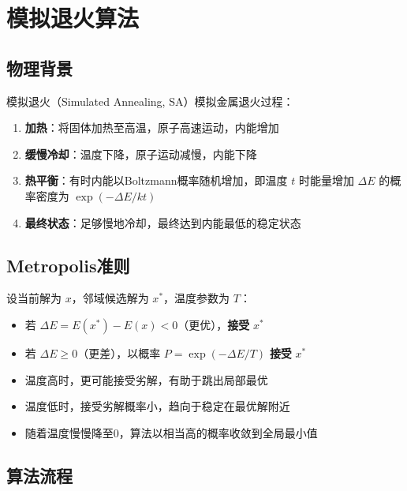 \section{模拟退火算法}\label{sec:sa}

\subsection{物理背景}

模拟退火（Simulated Annealing, SA）模拟金属退火过程：
\begin{enumerate}[label=\arabic*., leftmargin=2em]
    \item \textbf{加热}：将固体加热至高温，原子高速运动，内能增加
    \item \textbf{缓慢冷却}：温度下降，原子运动减慢，内能下降
    \item \textbf{热平衡}：有时内能以Boltzmann概率随机增加，即温度 $t$ 时能量增加 $\Delta E$ 的概率密度为 $\exp(-\Delta E / kt)$
    \item \textbf{最终状态}：足够慢地冷却，最终达到内能最低的稳定状态
\end{enumerate}

\subsection{Metropolis准则}

\begin{definition}[Metropolis接受准则]
设当前解为 $x$，邻域候选解为 $x^*$，温度参数为 $T$：
\begin{itemize}
    \item 若 $\Delta E = E(x^*) - E(x) < 0$（更优），\textbf{接受} $x^*$
    \item 若 $\Delta E \geq 0$（更差），以概率 $P = \exp(-\Delta E / T)$ \textbf{接受} $x^*$
\end{itemize}
\end{definition}

\begin{notebox}[模拟退火的关键机制]
\begin{itemize}[itemsep=0.3em]
    \item 温度高时，更可能接受劣解，有助于跳出局部最优
    \item 温度低时，接受劣解概率小，趋向于稳定在最优解附近
    \item 随着温度慢慢降至0，算法以相当高的概率收敛到全局最小值
\end{itemize}
\end{notebox}

\subsection{算法流程}

